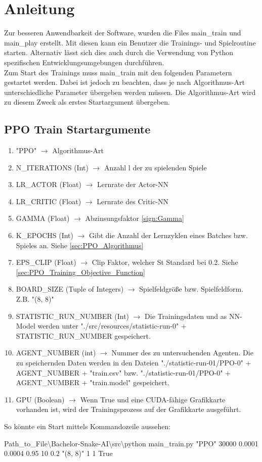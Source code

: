 \chapter{Anleitung}
Zur besseren Anwendbarkeit der Software, wurden die Files main\_train und main\_play erstellt. Mit diesen kann ein Benutzer die Trainings- und Spielroutine starten. Alternativ lässt sich dies auch durch die Verwendung von Python spezifischen Entwicklungsumgebungen durchführen.\\
Zum Start des Trainings muss  main\_train mit den folgenden Parametern gestartet werden. Dabei ist jedoch zu beachten, dass je nach Algorithmus-Art unterschiedliche Parameter übergeben werden müssen. Die Algorithmus-Art wird zu diesem Zweck als erstes Startargument übergeben.

\section{PPO Train Startargumente} 
\begin{enumerate}
	\item "PPO" $\longrightarrow$ Algorithmus-Art
	\item N\_ITERATIONS (Int) $\longrightarrow$ Anzahl l der zu spielenden Spiele
	\item LR\_ACTOR (Float) $\longrightarrow$ Lernrate der Actor-NN
	\item LR\_CRITIC (Float) $\longrightarrow$ Lernrate des Critic-NN
	\item GAMMA (Float) $\longrightarrow$ Abzinsungsfaktor \ref{sign:Gamma}
	\item K\_EPOCHS (Int) $\longrightarrow$ Gibt die Anzahl der  Lernzyklen eines Batches bzw. Spieles an. Siehe \ref{sec:PPO_Algorithmus}
	\item EPS\_CLIP (Float) $\longrightarrow$ Clip Faktor, welcher St Standard bei 0.2. Siehe \ref{sec:PPO_Training_Objective_Function}
	\item BOARD\_SIZE (Tuple of Integers) $\longrightarrow$ Spielfeldgröße bzw. Spielfeldform. Z.B. "(8, 8)"
	\item STATISTIC\_RUN\_NUMBER (Int) $\longrightarrow$ Die Trainingsdaten und as NN-Model werden unter "./src/resources/statistic-run-0" + STATISTIC\_RUN\_NUMBER gespeichert.
	\item AGENT\_NUMBER (int) $\longrightarrow$ Nummer des zu untersuchenden Agenten. Die zu speichernden Daten werden in den Dateien "./statistic-run-01/PPO-0" + AGENT\_NUMBER + "train.csv" bzw. "./statistic-run-01/PPO-0" + AGENT\_NUMBER + "train.model" gespeichert.
	\item GPU (Boolean) $\longrightarrow$ Wenn True und eine CUDA-fähige Grafikkarte vorhanden ist, wird der Trainingsprozess auf der Grafikkarte ausgeführt.
\end{enumerate}
So könnte ein Start mittels Kommandozeile aussehen:
\begin{center}
	Path\_to\_File\textbackslash Bachelor-Snake-AI\textbackslash src\textbackslash python main\_train.py "PPO"{} 30000 0.0001 0.0004 0.95 10 0.2 "(8, 8)"{} 1 1 True
\end{center}


